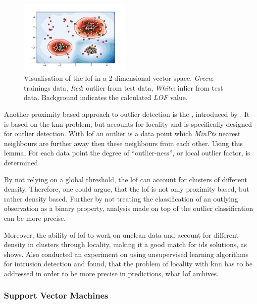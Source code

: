\begin{figure}
	\centering
	\includegraphics[width=0.48\textwidth,trim={12mm 5mm 15mm 10mm},keepaspectratio,clip]{figures/200-background-lof.pdf}
	\caption[Visualisation of the Local Outlier Factor]{Visualisation of the \gls{lof} in a 2 dimensional vector space. \emph{Green}: trainings data, \emph{Red}: outlier from test data, \emph{White}: inlier from test data. Background indicates the calculated \emph{LOF} value.}
	\label{fig:background:network:novelty:lof}
\end{figure}

Another proximity based approach to outlier detection is the , introduced by \textcite{Breunig2000}. It is based on the \gls{knn} problem, but accounts for locality and is specifically designed for outlier detection.
With \gls{lof} an outlier is a data point which \emph{MinPts} nearest neighbours are further away then these neighbours from each other. 
Using this lemma, For each data point the degree of \enquote{outlier-ness}, or local outlier factor, is determined.

By not relying on a global threshold, the \gls{lof} can account for clusters of different density. Therefore, one could argue, that the \gls{lof} is not only proximity based, but rather density based. Further by not treating the classification of an outlying observation as a binary property, analysis made on top of the outlier classification can be more precise. \parencite[cf.][]{Breunig2000}

Moreover, the ability of \gls{lof} to work on unclean data and account for different density in clusters through locality, making it a good match for \gls{ids} solutions, as \textcite{Lazarevic2003} shows. Also \textcite{Zanero2004} conducted an experiment on using unsupervised learning algorithms for intrusion detection and found, that the problem of locality with \gls{knn} has to be addressed in order to be more precise in predictions, what \gls{lof} archives.


\subsubsection{Support Vector Machines}
\label{sec:background:network:novelty:svm}

